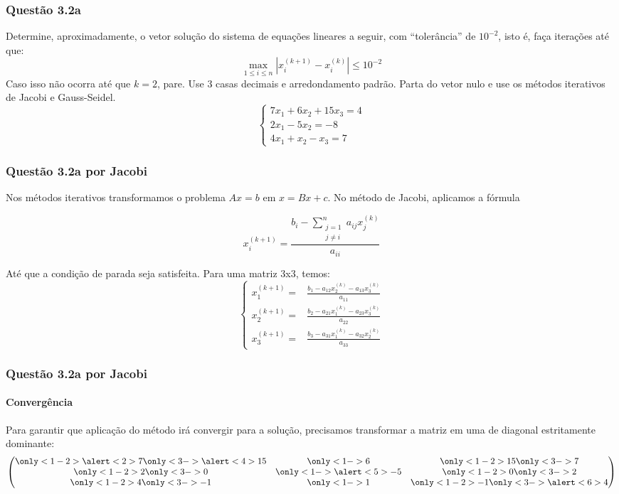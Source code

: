 \begin{frame}
\frametitle{Questão 3.2a}
Determine, aproximadamente, o vetor solução do sistema de equações lineares a seguir, com ``tolerância'' de $10^{-2}$, isto é, faça iterações até que:
\[
\max_{1 \le i \le n}\left| x_i^{(k+1)} - x_i^{(k)} \right| \le 10^{-2}
\]
Caso isso não ocorra até que $k = 2$, pare. Use 3 casas decimais e arredondamento padrão.
%
Parta do vetor nulo e use os métodos iterativos de Jacobi e Gauss-Seidel.
\[
\left\{
\begin{array}{l}
7 x_1 + 6x_2 + 15 x_3 = 4\\
2 x_1 -5x_2 = -8\\
4 x_1 +x_2 - x_3 = 7
\end{array}
\right.
\]
\end{frame}

\begin{frame}
\frametitle{Questão 3.2a por Jacobi}
Nos métodos iterativos transformamos o problema $Ax = b$ em $x = Bx + c$. 
%
No método de Jacobi, aplicamos a fórmula

\[
x_i^{(k+1)} = \frac{b_i - \sum_{\substack{j = 1\\j \ne i}}^{n}a_{ij}x_j^{(k)}}{a_{ii}}
\]

Até que a condição de parada seja satisfeita. 
%
Para uma matriz 3x3, temos:
\[
\left\{
\begin{array}{ll}
x_1^{(k+1)} = &\frac{b_1-a_{12}x_2^{(k)}-a_{13}x_3^{(k)}}{a_{11}}\\
x_2^{(k+1)} = &\frac{b_2-a_{21}x_1^{(k)}-a_{23}x_3^{(k)}}{a_{22}}\\
x_3^{(k+1)} = &\frac{b_3-a_{31}x_1^{(k)}-a_{32}x_2^{(k)}}{a_{33}}
\end{array}
\right.
\]
\end{frame}

\begin{frame}
\frametitle{Questão 3.2a por Jacobi}
\framesubtitle{Convergência}
Para garantir que aplicação do método irá convergir para a solução, precisamos transformar a matriz em uma de diagonal estritamente dominante:
\[
\begin{pmatrix}
\only<1-2>{\alert<2>{7}}\only<3->{\alert<4>{15}} & 
  \only<1->{6} & 
  \only<1-2>{15}\only<3->{7}
  \\
%
\only<1-2>{2}\only<3->{0} & 
  \only<1->{\alert<5>{-5}} & 
  \only<1-2>{0}\only<3->{2}\\
%
\only<1-2>{4}\only<3->{-1} & 
  \only<1->{1 }& 
  \only<1-2>{-1}\only<3->{\alert<6>{4}}
\end{pmatrix}
\]

\end{frame}

